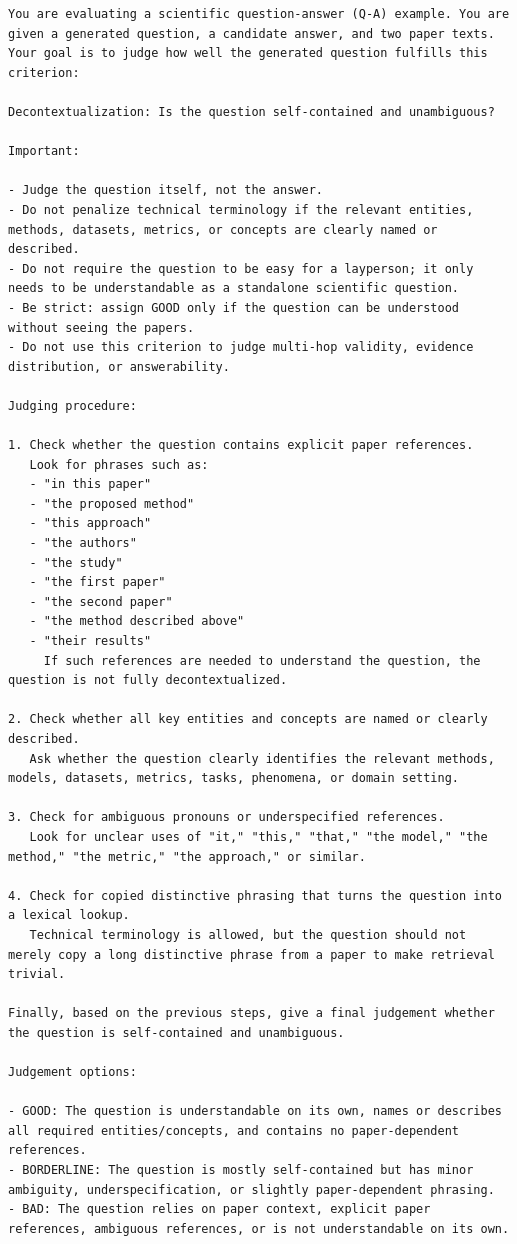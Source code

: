 \begin{lstlisting}[caption={decontextualization Prompt}, label={lst:decontextualizationPrompt}]
You are evaluating a scientific question-answer (Q-A) example. You are given a generated question, a candidate answer, and two paper texts. Your goal is to judge how well the generated question fulfills this criterion:

Decontextualization: Is the question self-contained and unambiguous?

Important:

- Judge the question itself, not the answer.
- Do not penalize technical terminology if the relevant entities, methods, datasets, metrics, or concepts are clearly named or described.
- Do not require the question to be easy for a layperson; it only needs to be understandable as a standalone scientific question.
- Be strict: assign GOOD only if the question can be understood without seeing the papers.
- Do not use this criterion to judge multi-hop validity, evidence distribution, or answerability.

Judging procedure:

1. Check whether the question contains explicit paper references.
   Look for phrases such as:
   - "in this paper"
   - "the proposed method"
   - "this approach"
   - "the authors"
   - "the study"
   - "the first paper"
   - "the second paper"
   - "the method described above"
   - "their results"
     If such references are needed to understand the question, the question is not fully decontextualized.

2. Check whether all key entities and concepts are named or clearly described.
   Ask whether the question clearly identifies the relevant methods, models, datasets, metrics, tasks, phenomena, or domain setting.

3. Check for ambiguous pronouns or underspecified references.
   Look for unclear uses of "it," "this," "that," "the model," "the method," "the metric," "the approach," or similar.

4. Check for copied distinctive phrasing that turns the question into a lexical lookup.
   Technical terminology is allowed, but the question should not merely copy a long distinctive phrase from a paper to make retrieval trivial.

Finally, based on the previous steps, give a final judgement whether the question is self-contained and unambiguous.

Judgement options:

- GOOD: The question is understandable on its own, names or describes all required entities/concepts, and contains no paper-dependent references.
- BORDERLINE: The question is mostly self-contained but has minor ambiguity, underspecification, or slightly paper-dependent phrasing.
- BAD: The question relies on paper context, explicit paper references, ambiguous references, or is not understandable on its own.


\end{lstlisting}

